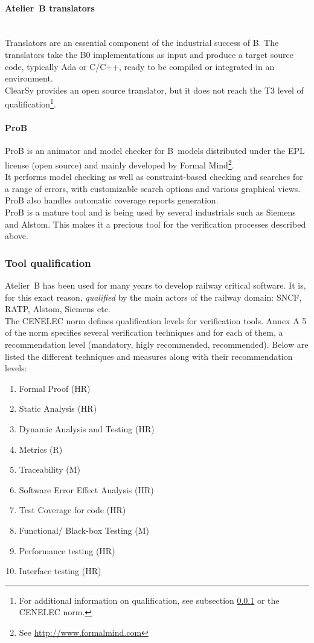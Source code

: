 \paragraph{Atelier~B translators}~\\
Translators are an essential component of the industrial success of B. The translators take the B0 implementations as input and produce a target source code, typically Ada or C/C++, ready to be compiled or integrated in an environment.\\
ClearSy provides an open source translator, but it does not reach the T3 level of qualification\footnote{For additional information on qualification, see subsection \ref{subsec:qualif} or the CENELEC norm.}.

\paragraph{ProB}
\label{subsec:prob}
ProB is an animator and model checker for B~models distributed under the EPL license (open source) and mainly developed by Formal Mind\footnote{See \url{http://www.formalmind.com}}.\\
It performs model checking as well as constraint-based checking and searches for a range of errors, with customizable search options and various graphical views. ProB also handles automatic coverage reports generation.\\
ProB is a mature tool and is being used by several industrials such as Siemens and Alstom. This makes it a precious tool for the verification processes described above.

\subsubsection{Tool qualification}
\label{subsec:qualif}
Atelier~B has been used for many years to develop railway critical software. It is, for this exact reason, {\itshape qualified} by the main actors of the railway domain: SNCF, RATP, Alstom, Siemens etc.\\

The CENELEC norm defines qualification levels for verification tools. Annex A 5 of the norm specifies several verification techniques and for each of them, a recommendation level (mandatory, higly recommended, recommended). Below are listed the different techniques and measures along with their recommendation levels:
\begin{enumerate}
\item Formal Proof (HR)
\item Static Analysis (HR)
\item Dynamic Analysis and Testing (HR)
\item Metrics (R)
\item Traceability (M)
\item Software Error Effect Analysis (HR)
\item Test Coverage for code (HR)
\item Functional/ Black-box Testing (M)
\item Performance testing (HR)
\item Interface testing (HR)
\end{enumerate}

